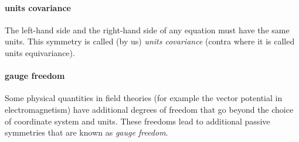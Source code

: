 \documentclass{article}
\theoremstyle{plain}
\theoremstyle{definition}
\theoremstyle{remark}
\begin{document}
\paragraph{units covariance}
The left-hand side and the right-hand side of any equation must have the same units.
This symmetry is called (by us) \emph{units covariance} (contra \cite{villar2022dimensionless} where it is called units equivariance).

\paragraph{gauge freedom}
Some physical quantities in field theories (for example the vector potential in electromagnetism) have additional degrees of freedom that go beyond the choice of coordinate system and units.
These freedoms lead to additional passive symmetries that are known as \emph{gauge freedom}.
\end{document}
